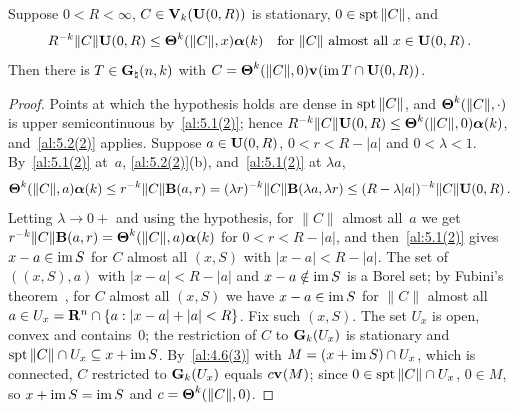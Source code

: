 \begin{theorem}
    \label{al:5.3}
    Suppose $0 < R < \infty$, $C \in \mathbf{V}_{k}(\mathbf{U}(0,R))$ is stationary, $0 \in \operatorname{spt}
    \|C\|$, and
    \begin{displaymath}
        R^{-k} \|C\| \mathbf{U}(0,R) \le \boldsymbol{\Theta}^{k}(\|C\|,x) \boldsymbol{\alpha}(k) \quad
        \text{for $\|C\|$ almost all $x \in \mathbf{U}(0,R)$} \,.
    \end{displaymath}
    Then there is $T \in \mathbf{G}_{\natural}(n,k)$ with $C = \boldsymbol{\Theta}^{k}(\|C\|,0) \mathbf{v}_{}(\operatorname{im} T
    \cap \mathbf{U}(0,R))$.
\end{theorem}

\begin{proof}
    Points at which the hypothesis holds are dense in $\operatorname{spt} \|C\|$, and $\boldsymbol{\Theta}^{k}(\|C\|,
    \cdot)$ is upper semicontinuous by~\ref{al:5.1(2)}; hence $R^{-k} \|C\| \mathbf{U}(0,R) \le
    \boldsymbol{\Theta}^{k}(\|C\|,0) \boldsymbol{\alpha}(k)$, and~\ref{al:5.2(2)} applies. Suppose $a \in
    \mathbf{U}(0,R)$, $0 < r < R - |a|$ and $0 < \lambda < 1$. By~\ref{al:5.1(2)} at~$a$,
    \ref{al:5.2(2)}(b), and~\ref{al:5.1(2)} at $\lambda a$,
    \begin{displaymath}
        \boldsymbol{\Theta}^{k}(\|C\|,a) \boldsymbol{\alpha}(k) \le r^{-k} \|C\| \mathbf{B}(a,r) = (\lambda
        r)^{-k} \|C\| \mathbf{B}(\lambda a,\lambda r) \le (R - \lambda|a|)^{-k} \|C\|
        \mathbf{U}(0,R) \,.
    \end{displaymath}
    Letting $\lambda \to 0+$ and using the hypothesis, for $\|C\|$ almost all~$a$ we get
    $r^{-k} \|C\| \mathbf{B}(a,r) = \boldsymbol{\Theta}^{k}(\|C\|,a) \boldsymbol{\alpha}(k)$ for $0 < r <
    R - |a|$, and then~\ref{al:5.1(2)} gives $x - a \in \operatorname{im} S$ for $C$ almost all $(x,S)$ with
    $|x - a| < R - |a|$. The set of $((x,S),a)$ with $|x - a| < R - |a|$ and $x - a \notin \operatorname{im} S$
    is a Borel set; by Fubini's theorem~\cite[2.6.2]{Federer1969}, for $C$ almost all $(x,S)$ we
    have $x - a \in \operatorname{im} S$ for $\|C\|$ almost all $a \in U_x = \mathbf{R}^{n} \cap \{ a : |x - a| + |a|
    < R \}$. Fix such $(x,S)$. The set $U_x$ is open, convex and contains~$0$; the restriction of
    $C$ to $\mathbf{G}_{k}(U_x)$ is stationary and $\operatorname{spt} \|C\| \cap U_x \subseteq x + \operatorname{im} S$. By~\ref{al:4.6(3)}
    with $M = (x + \operatorname{im} S) \cap U_x$, which is connected, $C$ restricted to $\mathbf{G}_{k}(U_x)$ equals $c
    \mathbf{v}_{}(M)$; since $0 \in \operatorname{spt} \|C\| \cap U_x$, $0 \in M$, so $x + \operatorname{im} S = \operatorname{im} S$ and $c =
    \boldsymbol{\Theta}^{k}(\|C\|,0)$.


\end{proof}
